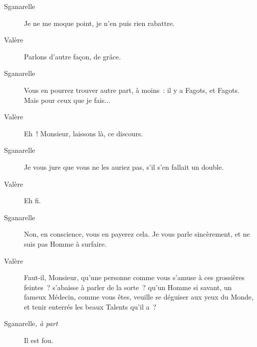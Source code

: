 \documentclass[french,twoside]{book} %
\begin{document}
 \begin{description} \item[Sganarelle] 

Je ne me moque point, je n’en puis rien rabattre.\end{description}
 \begin{description} \item[Valère] 

Parlons d’autre façon, de grâce.\end{description}
 \begin{description} \item[Sganarelle] 

Vous en pourrez trouver autre part, à moins : il y a Fagots, et Fagots. Mais pour ceux que je fais...\end{description}
 \begin{description} \item[Valère] 

Eh ! Monsieur, laissons là, ce discours.\end{description}
 \begin{description} \item[Sganarelle] 

Je vous jure que vous ne les auriez pas, s’il s’en fallait un double.\end{description}
 \begin{description} \item[Valère] 

Eh fi.\end{description}
 \begin{description} \item[Sganarelle] 

Non, en conscience, vous en payerez cela. Je vous parle sincèrement, et ne suis pas Homme à surfaire.\end{description}
 \begin{description} \item[Valère] 

Faut-il, Monsieur, qu’une personne comme vous s’amuse à ces grossières feintes ? s’abaisse à parler de la sorte ? qu’un Homme si savant, un fameux Médecin, comme vous êtes, veuille se déguiser aux yeux du Monde, et tenir enterrés les beaux Talents qu’il a ?\end{description}
 \begin{description} \item[Sganarelle\textit{, à part}\par
] 

Il est fou.\end{description}
\end{document}
